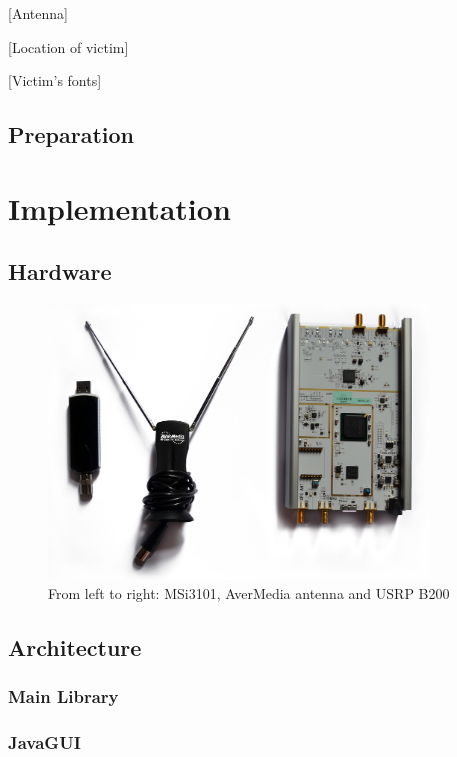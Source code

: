 \documentclass[a4paper,12pt,twoside,openright]{report}
\begin{document}
{{{{{[Antenna]

[Location of victim]

[Victim's fonts]

\section{Preparation}

\chapter{Implementation} 

\section{Hardware}
\label{sec:hw} 

\begin{figure}[h!]
 
  \centering
    \includegraphics[width=0.9\textwidth]{equipment}
    \caption{From left to right: MSi3101, AverMedia antenna and USRP B200}
\end{figure}


\section{Architecture}

\subsection{Main Library}

\subsection{JavaGUI}

}}}}}
\end{document}
